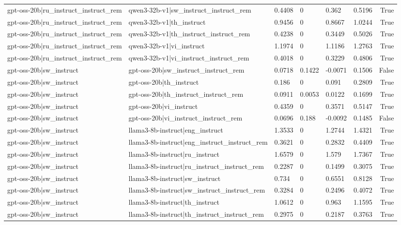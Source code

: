 \begin{table}
\begin{tabular}{llllllr}
gpt-oss-20b|ru_instruct_instruct_rem & qwen3-32b-v1|sw_instruct_instruct_rem & 0.4408 & 0 & 0.362 & 0.5196 & True \\
gpt-oss-20b|ru_instruct_instruct_rem & qwen3-32b-v1|th_instruct & 0.9456 & 0 & 0.8667 & 1.0244 & True \\
gpt-oss-20b|ru_instruct_instruct_rem & qwen3-32b-v1|th_instruct_instruct_rem & 0.4238 & 0 & 0.3449 & 0.5026 & True \\
gpt-oss-20b|ru_instruct_instruct_rem & qwen3-32b-v1|vi_instruct & 1.1974 & 0 & 1.1186 & 1.2763 & True \\
gpt-oss-20b|ru_instruct_instruct_rem & qwen3-32b-v1|vi_instruct_instruct_rem & 0.4018 & 0 & 0.3229 & 0.4806 & True \\
gpt-oss-20b|sw_instruct & gpt-oss-20b|sw_instruct_instruct_rem & 0.0718 & 0.1422 & -0.0071 & 0.1506 & False \\
gpt-oss-20b|sw_instruct & gpt-oss-20b|th_instruct & 0.186 & 0 & 0.091 & 0.2809 & True \\
gpt-oss-20b|sw_instruct & gpt-oss-20b|th_instruct_instruct_rem & 0.0911 & 0.0053 & 0.0122 & 0.1699 & True \\
gpt-oss-20b|sw_instruct & gpt-oss-20b|vi_instruct & 0.4359 & 0 & 0.3571 & 0.5147 & True \\
gpt-oss-20b|sw_instruct & gpt-oss-20b|vi_instruct_instruct_rem & 0.0696 & 0.188 & -0.0092 & 0.1485 & False \\
gpt-oss-20b|sw_instruct & llama3-8b-instruct|eng_instruct & 1.3533 & 0 & 1.2744 & 1.4321 & True \\
gpt-oss-20b|sw_instruct & llama3-8b-instruct|eng_instruct_instruct_rem & 0.3621 & 0 & 0.2832 & 0.4409 & True \\
gpt-oss-20b|sw_instruct & llama3-8b-instruct|ru_instruct & 1.6579 & 0 & 1.579 & 1.7367 & True \\
gpt-oss-20b|sw_instruct & llama3-8b-instruct|ru_instruct_instruct_rem & 0.2287 & 0 & 0.1499 & 0.3075 & True \\
gpt-oss-20b|sw_instruct & llama3-8b-instruct|sw_instruct & 0.734 & 0 & 0.6551 & 0.8128 & True \\
gpt-oss-20b|sw_instruct & llama3-8b-instruct|sw_instruct_instruct_rem & 0.3284 & 0 & 0.2496 & 0.4072 & True \\
gpt-oss-20b|sw_instruct & llama3-8b-instruct|th_instruct & 1.0612 & 0 & 0.963 & 1.1595 & True \\
gpt-oss-20b|sw_instruct & llama3-8b-instruct|th_instruct_instruct_rem & 0.2975 & 0 & 0.2187 & 0.3763 & True \\

\end{tabular}
\end{table}
